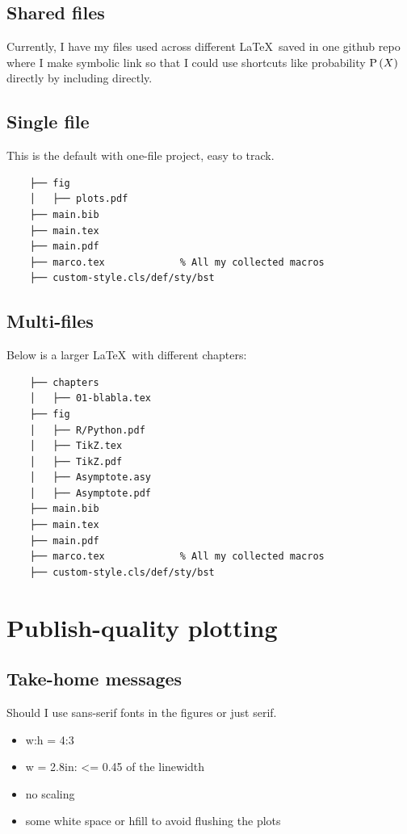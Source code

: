 \documentclass[aos,preprint]{imsart}
\begin{document}
\subsection{Shared files}

Currently, I have my files used across different \LaTeX\ saved in one
github repo where I make symbolic link so that I could use shortcuts like probability
$\operatorname{\mathrm{P}} \left( {X} \right)$ directly by including directly.

\subsection{Single file}

This is the default with one-file project, easy to track.

\begin{Verbatim}
	├── fig
	│   ├── plots.pdf
	├── main.bib
	├── main.tex
	├── main.pdf
	├── marco.tex             % All my collected macros
	├── custom-style.cls/def/sty/bst
\end{Verbatim}

\subsection{Multi-files}

Below is a larger \LaTeX\ with different chapters:

\begin{Verbatim}
	├── chapters
	│   ├── 01-blabla.tex
	├── fig
	│   ├── R/Python.pdf
	│   ├── TikZ.tex
	│   ├── TikZ.pdf
	│   ├── Asymptote.asy
	│   ├── Asymptote.pdf
	├── main.bib
	├── main.tex
	├── main.pdf
	├── marco.tex             % All my collected macros
	├── custom-style.cls/def/sty/bst
\end{Verbatim}


\newpage

\section{Publish-quality plotting}

\subsection{Take-home messages}

Should I use sans-serif fonts in the figures or just serif.

\begin{itemize}
	\item w:h = 4:3
	\item w = 2.8in: <= 0.45 of the linewidth
	\item no scaling
	\item some white space or hfill to avoid flushing the plots
\end{itemize}
\end{document}
